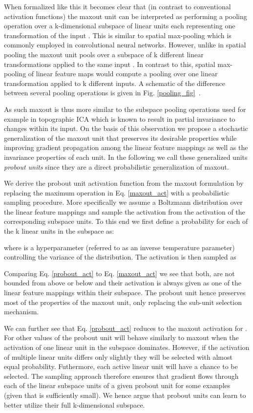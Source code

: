 \documentclass{article} \pdfoutput=1
\begin{document}
When formalized like this it becomes clear that (in contrast to
conventional activation functions) the maxout unit can be interpreted
as performing a pooling operation over a k-dimensional subspace of
linear units  each representing one transformation
of the input . This is similar to spatial max-pooling
which is commonly employed in convolutional neural networks. However,
unlike in spatial pooling the maxout unit pools over a subspace of k
different linear transformations applied to the same input
. In contrast to this, spatial max-pooling of linear
feature maps would compute a pooling over one linear transformation
applied to k different inputs. A schematic of the difference between
several pooling operations is given in Fig. \ref{pooling_fig}~.

As such maxout is thus more similar to the subspace pooling operations
used for example in topographic ICA \cite{Hyvarinnen2009} which is
known to result in partial invariance to changes within its input. On the
basis of this observation we propose a stochastic generalization of
the maxout unit that preserves its desirable properties while
improving gradient propagation among the  linear feature mappings
as well as the invariance properties of each unit. In the following we
call these generalized units \emph{probout units} since they are a
direct probabilistic generalization of maxout.

We derive the probout unit activation function from the maxout
formulation by replacing the maximum operation in
Eq. \eqref{maxout_act} with a probabilistic sampling procedure. More
specifically we assume a Boltzmann distribution over the  linear
feature mappings and sample the
activation  from the activation of the corresponding
subspace units. To this end we first define a probability for each of
the k linear units in the subspace as:
 
where  is a hyperparameter (referred to as an inverse
temperature parameter) controlling the variance of the distribution.
The activation  is then sampled as 
  
Comparing Eq. \eqref{probout_act} to Eq. \eqref{maxout_act} we see
that both, are not bounded from above or below and their activation is
always given as one of the linear feature mappings within their
subspace. The probout unit hence preserves most of the properties of
the maxout unit, only replacing the sub-unit selection mechanism.

We can further see that Eq. \eqref{probout_act} reduces to the maxout
activation for . For other values of
 the probout unit will behave similarly to maxout when the
activation of one linear unit in the subspace dominates. However, if
the activation of multiple linear units differs only slightly they will
be selected with almost equal probability. Futhermore, each active
linear unit will have a chance to be selected. The sampling approach
therefore ensures that gradient flows through each of the  linear
subspace units of a given probout unit for some examples (given that
 is sufficiently small). We hence argue that probout units can learn to better
utilize their full k-dimensional subspace. 
\end{document}
